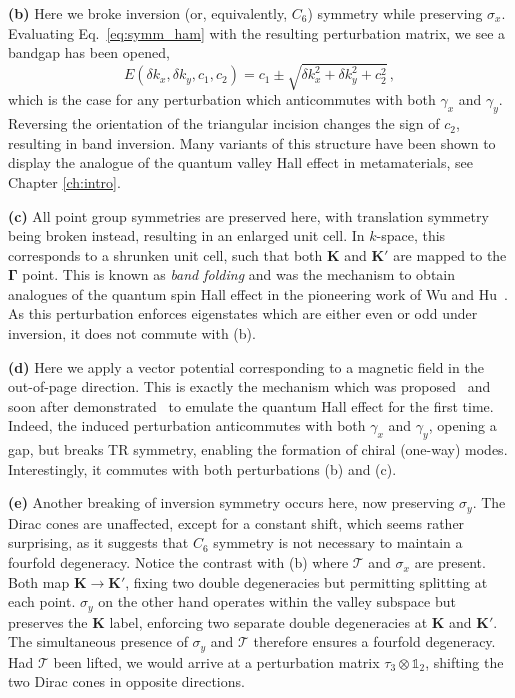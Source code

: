 \textbf{(b)} Here we broke inversion (or, equivalently, $C_6$) symmetry while preserving $\sigma_x$. Evaluating Eq.~\eqref{eq:symm_ham} with the resulting perturbation matrix, we see a bandgap has been opened,
\begin{equation}
E(\delta k_x, \delta k_y, c_1, c_2) = c_1 \pm \sqrt{\delta k_x^2 + \delta k_y^2 + c_2^2} \,,
\end{equation}
which is the case for any perturbation which anticommutes with both $\gamma_x$ and $\gamma_y$. Reversing the orientation of the triangular incision changes the sign of $c_2$, resulting in band inversion. Many variants of this structure have been shown to display the analogue of the quantum valley Hall effect in metamaterials, see Chapter \ref{ch:intro}.

\textbf{(c)} All point group symmetries are preserved here, with translation symmetry being broken instead, resulting in an enlarged unit cell. In $k$-space, this corresponds to a shrunken unit cell, such that both $\boldsymbol{K}$ and $\boldsymbol{K'}$ are mapped to the $\boldsymbol{\Gamma}$ point. This is known as \textit{band folding} and was the mechanism to obtain analogues of the quantum spin Hall effect in the pioneering work of Wu and Hu~\cite{Wu_Hu_2015}. As this perturbation enforces eigenstates which are either even or odd under inversion, it does not commute with (b).  

\textbf{(d)} Here we apply a vector potential corresponding to a magnetic field in the out-of-page direction. This is exactly the mechanism which was proposed~\cite{Haldane_2008} and soon after demonstrated~\cite{Wang_2009} to emulate the quantum Hall effect for the first time. Indeed, the induced perturbation anticommutes with both $\gamma_x$ and $\gamma_y$, opening a gap, but breaks TR symmetry, enabling the formation of chiral (one-way) modes. Interestingly, it commutes with both perturbations (b) and (c). 

\textbf{(e)} Another breaking of inversion symmetry occurs here, now preserving $\sigma_y$. The Dirac cones are unaffected, except for a constant shift, which seems rather surprising, as it suggests that $C_6$ symmetry is not necessary to maintain a fourfold degeneracy. Notice the contrast with (b) where $\mathcal{T}$ and $\sigma_x$ are present. Both map $\boldsymbol{K} \rightarrow \boldsymbol{K'}$, fixing two double degeneracies but permitting splitting at each point. $\sigma_y$ on the other hand operates within the valley subspace but preserves the $\boldsymbol{K}$ label, enforcing two separate double degeneracies at $\boldsymbol{K}$ and $\boldsymbol{K'}$. The simultaneous presence of $\sigma_y$ and $\mathcal{T}$ therefore ensures a fourfold degeneracy. Had $\mathcal{T}$ been lifted, we would arrive at a perturbation matrix $\tau_3 \otimes \mathbb{1}_2$, shifting the two Dirac cones in opposite directions.

